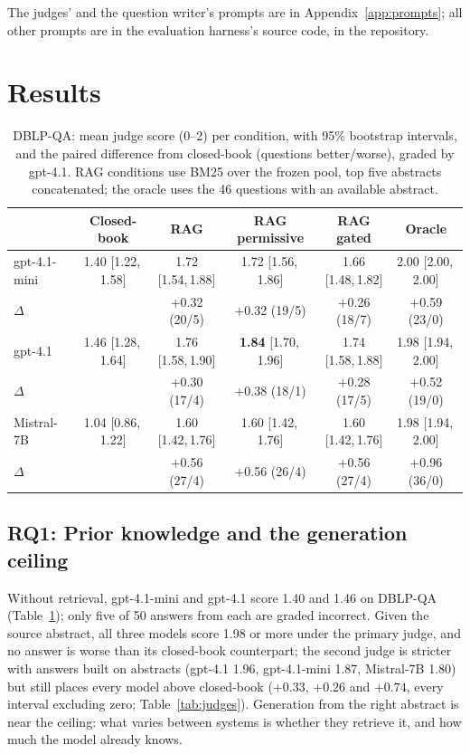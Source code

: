 \documentclass[conference]{IEEEtran}
\newcommand{\ci}[2]{{\scriptsize[#1,\,#2]}}
\newcommand{\dq}{DBLP-QA}
\begin{document}
The judges' and the question writer's prompts are in Appendix~\ref{app:prompts}; all other prompts are in
the evaluation harness's source code, in the repository.

\section{Results}

\begin{table}[t]
\caption{\dq{}: mean judge score (0--2) per condition, with 95\% bootstrap intervals, and the paired
difference from closed-book (questions better/worse), graded by gpt-4.1. RAG conditions use BM25 over
the frozen pool, top five abstracts concatenated; the oracle uses the 46 questions with an available
abstract.}
\label{tab:main}
\centering\small
\begin{tabular}{lccccc}
\toprule
 & Closed-book & RAG & RAG permissive & RAG gated & Oracle \\
\midrule
gpt-4.1-mini & 1.40 \ci{1.22}{1.58} & 1.72 \ci{1.54}{1.88} & 1.72 \ci{1.56}{1.86} & 1.66 \ci{1.48}{1.82} & 2.00 \ci{2.00}{2.00} \\
\quad $\Delta$ & & $+$0.32 (20/5) & $+$0.32 (19/5) & $+$0.26 (18/7) & $+$0.59 (23/0) \\
gpt-4.1 & 1.46 \ci{1.28}{1.64} & 1.76 \ci{1.58}{1.90} & \textbf{1.84} \ci{1.70}{1.96} & 1.74 \ci{1.58}{1.88} & 1.98 \ci{1.94}{2.00} \\
\quad $\Delta$ & & $+$0.30 (17/4) & $+$0.38 (18/1) & $+$0.28 (17/5) & $+$0.52 (19/0) \\
Mistral-7B & 1.04 \ci{0.86}{1.22} & 1.60 \ci{1.42}{1.76} & 1.60 \ci{1.42}{1.76} & 1.60 \ci{1.42}{1.76} & 1.98 \ci{1.94}{2.00} \\
\quad $\Delta$ & & $+$0.56 (27/4) & $+$0.56 (26/4) & $+$0.56 (27/4) & $+$0.96 (36/0) \\
\bottomrule
\end{tabular}
\end{table}

\subsection{RQ1: Prior knowledge and the generation ceiling}

Without retrieval, gpt-4.1-mini and gpt-4.1 score 1.40 and 1.46 on \dq{} (Table~\ref{tab:main}); only
five of 50 answers from each are graded incorrect. Given the source abstract, all three models score
1.98 or more under the primary judge, and no answer is worse than its closed-book counterpart; the second
judge is stricter with answers built on abstracts (gpt-4.1 1.96, gpt-4.1-mini 1.87, Mistral-7B 1.80) but
still places every model above closed-book ($+0.33$, $+0.26$ and $+0.74$, every interval excluding zero;
Table~\ref{tab:judges}). Generation from the right abstract is near the ceiling: what varies between systems is
whether they retrieve it, and how much the model already knows.
\end{document}
